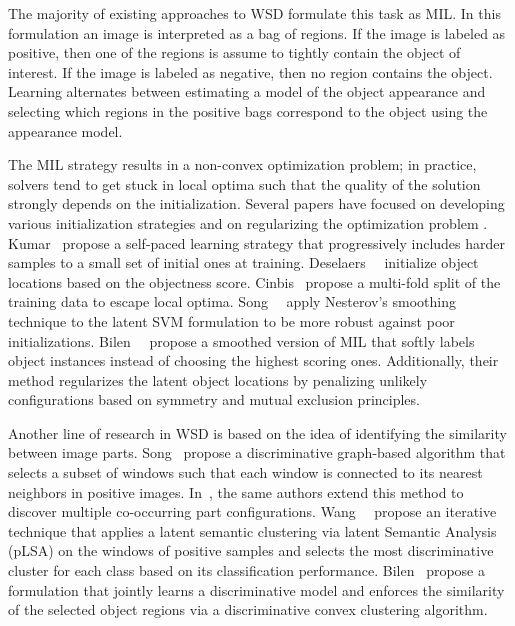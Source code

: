 The majority of existing approaches to WSD formulate this task as  MIL. In this formulation an image is interpreted as a bag of regions. If the image is labeled as positive, then one of the regions is assume to tightly contain the object of interest. If the image is labeled as negative, then no region contains the object. Learning alternates between estimating a model of the object appearance and selecting which regions in the positive bags correspond to the object using the appearance model. 

The MIL strategy results in a non-convex optimization problem; in practice, solvers tend to get stuck in local optima such that the quality of the solution strongly depends on the initialization. Several papers have focused on developing various initialization strategies \cite{Kumar10a,Deselaers10,Song14a,Cinbis15} and on regularizing the optimization problem \cite{Song14,Bilen14}. Kumar~\etal \cite{Kumar10a} propose a self-paced learning strategy that progressively includes harder samples to a small set of initial ones at training. Deselaers~\etal~\cite{Deselaers10} initialize object locations based on the objectness score. Cinbis~\etal \cite{Cinbis15} propose a multi-fold split of the training data to escape local optima. Song~\etal~\cite{Song14} apply Nesterov's smoothing technique \cite{Nesterov05} to the latent SVM formulation \cite{Felzenszwalb10a} to be more robust against poor initializations. Bilen~\etal~\cite{Bilen14} propose a smoothed version of MIL that softly labels object instances instead of choosing the highest scoring ones. Additionally, their method regularizes the latent object locations by penalizing unlikely configurations based on symmetry and mutual exclusion principles.

Another line of research in WSD \cite{Song14,Song14a,Wang14a} is based on the idea of identifying the similarity between image parts. Song~\etal \cite{Song14} propose a discriminative graph-based algorithm that selects a subset of windows such that each window is connected to its nearest neighbors in positive images. In~\cite{Song14a}, the same authors extend this method to discover multiple co-occurring part configurations. Wang~\etal~\cite{Wang14a} propose an iterative technique that applies a latent semantic clustering via latent Semantic Analysis (pLSA) on the windows of positive samples and selects the most discriminative cluster for each class based on its classification performance. Bilen~\etal \cite{Bilen15} propose a formulation that jointly learns a discriminative model and enforces the similarity of the selected object regions via a discriminative convex clustering algorithm.

